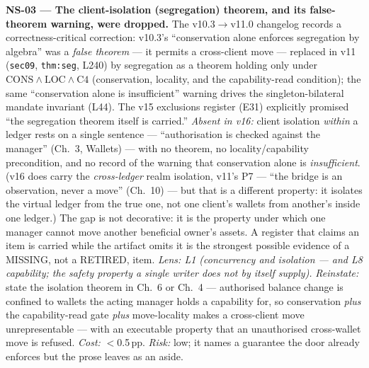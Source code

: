 \documentclass[11pt]{article}
\begin{document}
\textbf{NS-03 --- The client-isolation (segregation) theorem, and its false-theorem warning,
were dropped.}
The v10.3$\to$v11.0 changelog records a correctness-critical correction: v10.3's ``conservation
alone enforces segregation by algebra'' was a \emph{false theorem} --- it permits a cross-client
move --- replaced in v11 (\texttt{sec09}, \texttt{thm:seg}, L240) by segregation as a theorem holding
only under $\mathrm{CONS}\wedge\mathrm{LOC}\wedge\mathrm{C4}$ (conservation, locality, and the
capability-read condition); the same ``conservation alone is insufficient'' warning drives the
singleton-bilateral mandate invariant (L44). The v15 exclusions register (E31) explicitly
promised ``the segregation theorem itself is carried.'' \emph{Absent in v16:} client isolation
\emph{within} a ledger rests on a single sentence --- ``authorisation is checked against the
manager'' (Ch.~3, Wallets) --- with no theorem, no locality/capability precondition, and no
record of the warning that conservation alone is \emph{insufficient}. (v16 does carry the
\emph{cross-ledger} realm isolation, v11's P7 --- ``the bridge is an observation, never a
move'' (Ch.~10) --- but that is a different property: it isolates the virtual ledger from the
true one, not one client's wallets from another's inside one ledger.) The gap is not
decorative: it is the property under which one manager cannot move another beneficial owner's
assets. A register that claims an item is carried while the artifact omits
it is the strongest possible evidence of a MISSING, not a RETIRED, item. \emph{Lens: L1
(concurrency and isolation --- and L8 capability; the safety property a single writer does not
by itself supply).} \emph{Reinstate:} state the isolation theorem in Ch.~6 or Ch.~4 ---
authorised balance change is confined to wallets the acting manager holds a capability for, so
conservation \emph{plus} the capability-read gate \emph{plus} move-locality makes a cross-client
move unrepresentable --- with an executable property that an unauthorised cross-wallet move is
refused. \emph{Cost:} $<$0.5\,pp. \emph{Risk:} low; it names a guarantee the door already
enforces but the prose leaves as an aside.
\end{document}
